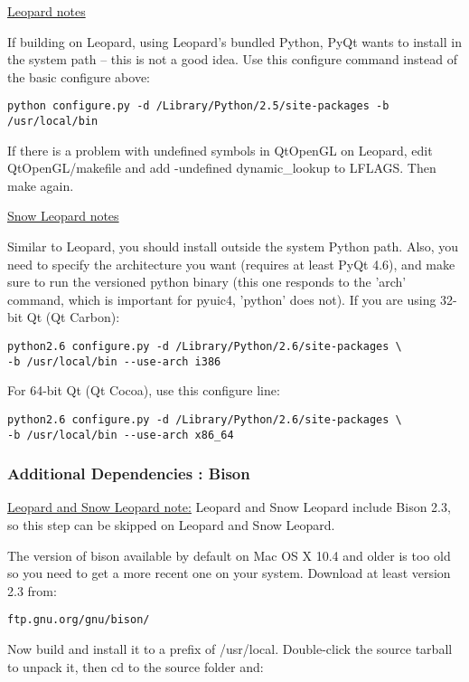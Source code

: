\underline{Leopard notes}

If building on Leopard, using Leopard's bundled Python, PyQt wants to install
in the system path -- this is not a good idea.  Use this configure command
instead of the basic configure above:

\begin{verbatim}
python configure.py -d /Library/Python/2.5/site-packages -b /usr/local/bin
\end{verbatim}

If there is a problem with undefined symbols in QtOpenGL on Leopard, edit
QtOpenGL/makefile and add -undefined dynamic\_lookup to LFLAGS.
Then make again.

\underline{Snow Leopard notes}

Similar to Leopard, you should install outside the system Python path.
Also, you need to specify the architecture you want (requires at least PyQt 4.6),
and make sure to run the versioned python binary (this one responds to the
'arch' command, which is important for pyuic4, 'python' does not).
If you are using 32-bit Qt (Qt Carbon):

\begin{verbatim}
python2.6 configure.py -d /Library/Python/2.6/site-packages \
-b /usr/local/bin --use-arch i386
\end{verbatim}

For 64-bit Qt (Qt Cocoa), use this configure line:

\begin{verbatim}
python2.6 configure.py -d /Library/Python/2.6/site-packages \
-b /usr/local/bin --use-arch x86_64
\end{verbatim}

\subsubsection{Additional Dependencies : Bison}
\underline{Leopard and Snow Leopard note:} Leopard and Snow Leopard include Bison 2.3, so this step can be skipped on Leopard and Snow Leopard.

The version of bison available by default on Mac OS X 10.4 and older is too old so you need to
get a more recent one on your system. Download at least version 2.3 from:

\begin{verbatim}
ftp.gnu.org/gnu/bison/
\end{verbatim}

Now build and install it to a prefix of /usr/local. Double-click the source
tarball to unpack it, then cd to the source folder and:

